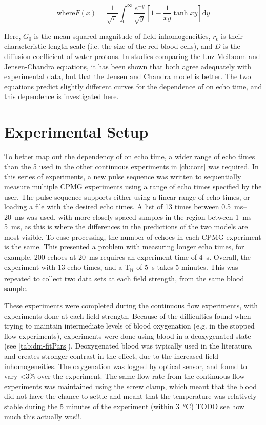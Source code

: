 \begin{displaymath}
\mathrm{where  } F(x) = \frac{1}{\sqrt{\pi}} \int_0^\infty \frac{e^{-y}}{\sqrt{y}} \left[1-\frac{1}{xy} \tanh{xy}\right] \mathrm{d}y
\end{displaymath}

Here, $G_0$ is the mean squared magnitude of field inhomogeneities, $r_c$ is their characteristic length scale (i.e. the size of the red blood cells), and $D$ is the diffusion coefficient of water protons.
In studies comparing the Luz-Meiboom and Jensen-Chandra equations, it has been shown that both agree adequately with experimental data, but that the Jensen and Chandra model is better.
The two equations predict slightly different curves for the dependence of \Ttwo on echo time, and this dependence is investigated here.

\section{Experimental Setup}
To better map out the dependency of \Ttwo on echo time, a wider range of echo times than the 5 used in the other continuous experiments in \autoref{ch:cont} was required.
In this series of experiments, a new pulse sequence  was written to sequentially measure multiple CPMG experiments using a range of echo times specified by the user.
The pulse sequence supports either using a linear range of echo times, or loading a file with the desired echo times.
A list of 13 times between \SIrange{0.5}{20}{ms} was used, with more closely spaced samples in the region between \SIrange{1}{5}{ms}, as this is where the differences in the predictions of the two models are most visible.
To ease processing, the number of echoes in each CPMG experiment is the same.
This presented a problem with measuring longer echo times, for example, 200 echoes at \SI{20}{ms} requires an experiment time of \SI{4}{\second}.
Overall, the experiment with 13 echo times, and a T\textsubscript{R} of \SI{5}{\second} takes 5 minutes.
This was repeated to collect two data sets at each field strength, from the same blood sample.

These experiments were completed during the continuous flow experiments, with experiments done at each field strength.
Because of the difficulties found when trying to maintain intermediate levels of blood oxygenation (e.g. in the stopped flow experiments), experiments were done using blood in a deoxygenated state (see \autoref{tab:dm-fitPars}).
Deoxygenated blood was typically used in the literature, and creates stronger contrast in the \Ttwo effect, due to the increased field inhomogeneities.
The oxygenation was logged by optical sensor, and found to vary <3\% over the experiment.
The same flow rate from the continuous flow experiments was maintained using the screw clamp, which meant that the blood did not have the chance to settle and meant that the temperature was relatively stable during the 5 minutes of the experiment (within \SI{3}{\celsius}) TODO see how much this actually was!!.


